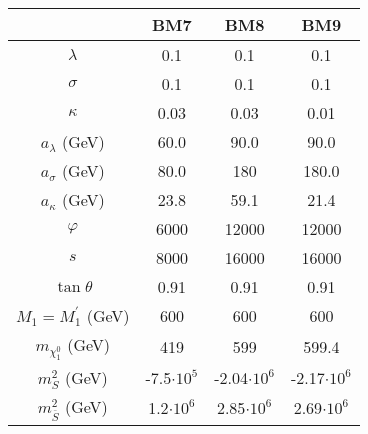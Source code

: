 \documentclass[12pt,a4paper]{article}
\begin{document}
\begin{table}
\end{table}



\begin{table}\noindent \begin{tabular}{| c || c | c | c |}
\hline
                                  &    BM7                 &  BM8         &     BM9                 \\   
\hline                                                                                                                                       
$\lambda$                         &    0.1              & 	0.1                 & 	0.1                                 \\    
$\sigma$                          &    0.1              & 	0.1                 & 	0.1                                 \\    
$\kappa$                          &    0.03             & 	0.03                & 	0.01                                \\    
$a_{\lambda}$ (GeV) 	          &    60.0             & 	90.0                & 	90.0                                \\    
$a_{\sigma}$ (GeV) 	          &    80.0             & 	180                  & 	180.0                      \\    
$a_{\kappa}$ (GeV) 	          &    23.8             & 	59.1                 & 	21.4                       \\    
$\varphi$                         &    6000             & 	12000               & 	12000                                \\    
$s$                   	         &     8000             & 	16000               & 	16000                                \\    
$\tan\theta$                     &      0.91            & 	0.91                & 	0.91                                  \\   
$M_1 = M_1^\prime$ (GeV) 	         &     600             & 	600                  & 	600                                                   \\
$m_{\chi_1^0}$ (GeV)                &     419              & 	599                    & 	599.4                                    \\   
$m_S^2$ (GeV)                     &    -7.5$\cdot 10^5$          & 	-2.04$\cdot 10^6$            & 	-2.17$\cdot 10^6$                             \\   
$m_{\overline{S}}^2$ (GeV)            &    1.2$\cdot 10^6$          & 	2.85$\cdot 10^6$              & 	2.69$\cdot 10^6$                                 \\

\end{tabular}
\end{table}
\end{document}
